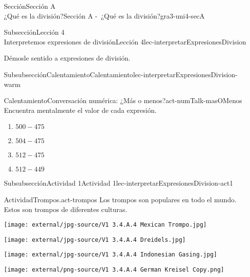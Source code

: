\begin{sectionptx}{Sección}{{\Large Sección A\\}¿Qué es la división?}{}{Sección A -~¿Qué es la división?}{}{}{gra3-uni4-secA}
\begin{subsectionptx}{Subsección}{{\normalsize Lección 4\\[-0.05cm]}Interpretemos expresiones de división}{}{Lección 4}{}{}{lec-interpretarExpresionesDivision}
\begin{introduction}{}%
Démosle sentido a expresiones de división.%
\end{introduction}%
%
%
\typeout{************************************************}
\typeout{************************************************}
%
\begin{subsubsectionptx}{Subsubsección}{Calentamiento}{}{Calentamiento}{}{}{lec-interpretarExpresionesDivision-warm}
\begin{exploration}{Calentamiento}{Conversación numérica: ¿Más o menos?}{act-numTalk-masOMenos}%
Encuentra mentalmente el valor de cada expresión.%
%
\begin{enumerate}[label={\Alph*.}]
\item{}\(\displaystyle 500 - 475\)%
\item{}\(\displaystyle 504 - 475\)%
\item{}\(\displaystyle 512 - 475\)%
\item{}\(\displaystyle 512 - 449\)%
\end{enumerate}
\end{exploration}%
\end{subsubsectionptx}
%
%
\typeout{************************************************}
\typeout{************************************************}
%
\begin{subsubsectionptx}{Subsubsección}{Actividad 1}{}{Actividad 1}{}{}{lec-interpretarExpresionesDivision-act1}
\begin{activity}{Actividad}{Trompos.}{act-trompos}%
Los trompos son populares en todo el mundo. Estos son trompos de diferentes culturas.%
\begin{sidebyside}{5}{0}{0}{0}%
\begin{sbspanel}{0.2}%
\texttt{[image: external/jpg-source/V1 3.4.A.4 Mexican Trompo.jpg]}
\end{sbspanel}%
\begin{sbspanel}{0.2}%
\texttt{[image: external/jpg-source/V1 3.4.A.4 Dreidels.jpg]}
\end{sbspanel}%
\begin{sbspanel}{0.2}%
\texttt{[image: external/jpg-source/V1 3.4.A.4 Indonesian Gasing.jpg]}
\end{sbspanel}%
\begin{sbspanel}{0.2}%
\texttt{[image: external/png-source/V1 3.4.A.4 German Kreisel Copy.png]}

\end{sbspanel}
\end{sidebyside}
\end{activity}
\end{subsubsectionptx}
\end{subsectionptx}
\end{sectionptx}
